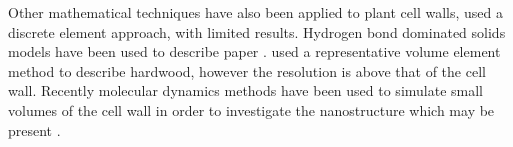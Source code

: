 Other mathematical techniques have also been applied to plant cell walls, \cite{HEPWORTH_1998} used a discrete element approach, with limited results. Hydrogen bond dominated solids models have been used to describe paper \cite{nissan1997link}\cite{batten1987unified}\cite{nissan1987unified}\cite{batten1987unified}. \cite{Zhan_2014} used a representative volume element method to describe hardwood, however the resolution is above that of the cell wall. Recently molecular dynamics methods have been used to simulate small volumes of
the cell wall in order to investigate the nanostructure which may be present \cite{jin2015molecular}\cite{Charlier_2012}\cite{Sangha_2011}\cite{Zhang_2009}\cite{houtman1995cellulose}.
